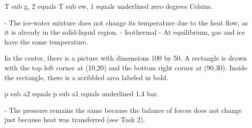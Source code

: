 T sub g, 2 equals T sub ew, 1 equals underlined zero degrees Celsius.

- The ice-water mixture does not change its temperature due to the heat flow, as it is already in the solid-liquid region.
- Isothermal
- At equilibrium, gas and ice have the same temperature.

In the center, there is a picture with dimensions 100 by 50. A rectangle is drawn with the top left corner at (10,20) and the bottom right corner at (90,30). Inside the rectangle, there is a scribbled area labeled in bold.

p sub a2 equals p sub a1 equals underlined 1.4 bar.

- The pressure remains the same because the balance of forces does not change just because heat was transferred (see Task 2).
